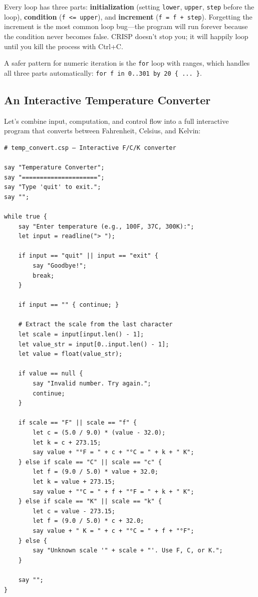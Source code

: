 \begin{tcolorbox}[colback=lightlavender, colframe=softvioletdark, title=\textbf{\textcolor{darkpurple}{Thinking in CRISP: Loop Design}}, fonttitle=\bfseries, sharp corners]
Every loop has three parts: \textbf{initialization} (setting \texttt{lower}, \texttt{upper}, \texttt{step} before the loop), \textbf{condition} (\texttt{f <= upper}), and \textbf{increment} (\texttt{f = f + step}). Forgetting the increment is the most common loop bug—the program will run forever because the condition never becomes false. CRISP doesn't stop you; it will happily loop until you kill the process with Ctrl+C.

A safer pattern for numeric iteration is the \texttt{for} loop with ranges, which handles all three parts automatically: \texttt{for f in 0..301 by 20 \{ ... \}}.
\end{tcolorbox}

\subsection{An Interactive Temperature Converter}

Let's combine input, computation, and control flow into a full interactive program that converts between Fahrenheit, Celsius, and Kelvin:

\begin{tcolorbox}[colback=codebg, colframe=darkpurple, colbacktitle=darkpurple, title=\textbf{\textcolor{codegold}{Interactive Temperature Converter (temp\_convert.csp)}}, fonttitle=\bfseries, sharp corners]
\begin{lstlisting}
# temp_convert.csp — Interactive F/C/K converter

say "Temperature Converter";
say "=====================";
say "Type 'quit' to exit.";
say "";

while true {
    say "Enter temperature (e.g., 100F, 37C, 300K):";
    let input = readline("> ");

    if input == "quit" || input == "exit" {
        say "Goodbye!";
        break;
    }

    if input == "" { continue; }

    # Extract the scale from the last character
    let scale = input[input.len() - 1];
    let value_str = input[0..input.len() - 1];
    let value = float(value_str);

    if value == null {
        say "Invalid number. Try again.";
        continue;
    }

    if scale == "F" || scale == "f" {
        let c = (5.0 / 9.0) * (value - 32.0);
        let k = c + 273.15;
        say value + "°F = " + c + "°C = " + k + " K";
    } else if scale == "C" || scale == "c" {
        let f = (9.0 / 5.0) * value + 32.0;
        let k = value + 273.15;
        say value + "°C = " + f + "°F = " + k + " K";
    } else if scale == "K" || scale == "k" {
        let c = value - 273.15;
        let f = (9.0 / 5.0) * c + 32.0;
        say value + " K = " + c + "°C = " + f + "°F";
    } else {
        say "Unknown scale '" + scale + "'. Use F, C, or K.";
    }

    say "";
}
\end{lstlisting}
\end{tcolorbox}

